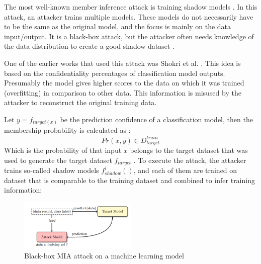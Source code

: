 The most well-known member inference attack is training shadow models \citep{rigaki_survey_2021}.
In this attack, an attacker trains multiple models.
These models do not necessarily have to be the same as the original model, and the focus is mainly on the data input/output.
It is a black-box attack, but the attacker often needs knowledge of the data distribution to create a good shadow dataset \citep{rigaki_survey_2021}.

One of the earlier works that used this attack was Shokri et al. \citep{shokri_membership_2017}.
This idea is based on the confidentiality percentages of classification model outputs. Presumably the model gives higher scores to the data on which it was trained (overfitting) in comparison to other data. This information is misused by the attacker to reconstruct the original training data.

 Let $y = f_{target(x)}$ be the prediction confidence of a classification model, then the membership probability is calculated as \citep{shokri_membership_2017}: 
\begin{equation}
    Pr(x, y) \in D^{train}_{target}
\end{equation}
Which is the probability of that input $x$ belongs to the target dataset that was used to generate the target dataset $f_{target}$ \citep{shokri_membership_2017}.
To execute the attack, the attacker trains so-called shadow models $f^i_{shadow}()$, and each of them are trained on dataset that is comparable to the training dataset and combined to infer training information:
\begin{figure}[H]
  \includegraphics[width=0.5\textwidth]{TheorethicalFramework/AttacksOnPrivacy/shadow-models-mi.png}
  \caption{Black-box MIA attack on a machine learning model \citep{shokri_membership_2017}}
\end{figure}

